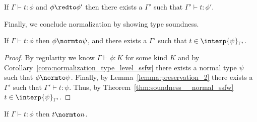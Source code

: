 \begin{lemma}
  \label{lemma:preservation_2}
  If $\Gamma \vdash t:\phi$ and $\phi \redto \phi'$ then there exists a $\Gamma'$ such that $\Gamma' \vdash t:\phi'$.
\end{lemma}

\noindent
Finally, we conclude normalization by showing type soundness.
\begin{thm}
  If $\Gamma \vdash t:\phi$ then $\phi \normto \psi$, and there exists a $\Gamma'$ such that $t \in \interp{\psi}_{\Gamma'}$.
  \label{thm:soundness_term_ssfw}
\end{thm}
\begin{proof}
  By regularity we know $\Gamma \vdash \phi:K$ for some kind $K$ and by Corollary~\ref{coro:normalization_type_level_ssfw}
  there exists a normal type $\psi$ such that $\phi \normto \psi$.  Finally,
  by Lemma~\ref{lemma:preservation_2} there exists a $\Gamma'$ such that $\Gamma' \vdash t:\psi$.  Thus, by Theorem~\ref{thm:soundness__normal_ssfw} 
  $t \in \interp{\psi}_{\Gamma'}$.
\end{proof}

\begin{corollary}[Normalization]
  If $\Gamma \vdash t:\phi$ then $t \normto n$.
\end{corollary}
